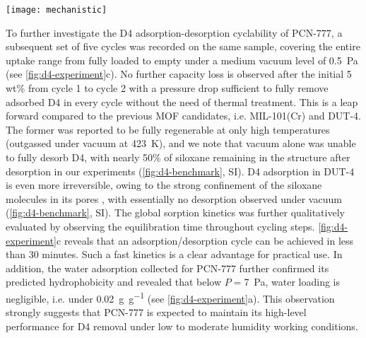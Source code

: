 \begin{widefigure}[htb]
    \centering
    \texttt{[image: mechanistic]}
    \caption{%
        Representative snapshots of the preferential sitting of D4 in the pores
        of PCN-777 at \SI{298}{\kelvin} for increasing loading at (a) 10\% with
        highlighted interactions distance between D4 and the MOF framework, and
        at (b) 40\%, (c) 65\%, and (d) 100\% fractional loading (\(\theta\)).
        Framework atoms (sticks) and D4 molecules (lines, and ball and sticks)
        are coded as Zr, N, O, Si, C, and H atoms in light blue, dark blue, red,
        yellow, dark grey, and light grey respectively. The separating distance
        is represented by dashed black lines and reported in Å.
    }\label{fig:d4-mechanistic}
\end{widefigure}

To further investigate the D4 adsorption-desorption cyclability of PCN-777, a
subsequent set of five cycles was recorded on the same sample, covering the
entire uptake range from fully loaded to empty under a medium vacuum level of
\SI{0.5}{\pascal} (see \cref{fig:d4-experiment}c). No further capacity loss is
observed after the initial 5 wt\% from cycle 1 to cycle 2 with a pressure drop
sufficient to fully remove adsorbed D4 in every cycle without the need of
thermal treatment. This is a leap forward compared to the previous MOF
candidates, i.e. MIL-101(Cr) and DUT-4. The former was reported
\citep{gargiuloChromiumbasedMIL101Metal2019} to be fully regenerable at only
high temperatures (outgassed under vacuum at \SI{423}{\kelvin}), and we note
that vacuum alone was unable to fully desorb D4, with nearly 50\% of siloxane
remaining in the structure after desorption in our experiments
(\cref{fig:d4-benchmark}, SI). D4 adsorption in DUT-4 is even more irreversible,
owing to the strong confinement of the siloxane molecules in its pores
\citep{mito-okaSiloxaneD4Capture2013}, with essentially no desorption observed
under vacuum (\cref{fig:d4-benchmark}, SI). The global sorption kinetics was
further qualitatively evaluated by observing the equilibration time throughout
cycling steps. \cref{fig:d4-experiment}c reveals that an adsorption/desorption
cycle can be achieved in less than 30 minutes. Such a fast kinetics is a clear
advantage for practical use. In addition, the water adsorption collected for
PCN-777 further confirmed its predicted hydrophobicity and revealed that below
\(P=\)\SI{7}{\pascal}, water loading is negligible, i.e. under
\SI{0.02}{\gram\per\gram} (see \cref{fig:d4-experiment}a). This observation
strongly suggests that PCN-777 is expected to maintain its high-level
performance for D4 removal under low to moderate humidity working conditions.

